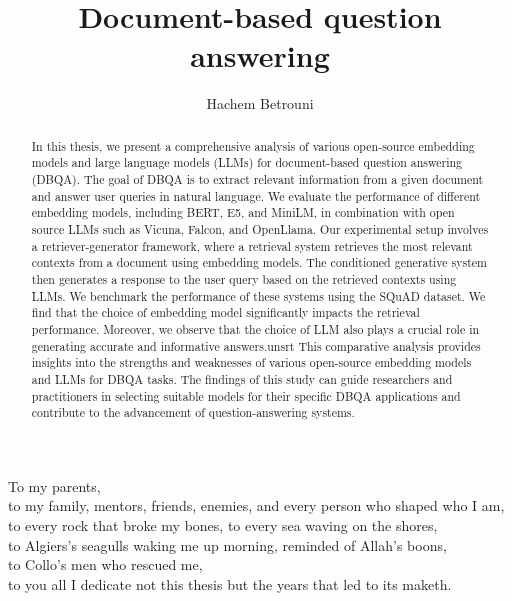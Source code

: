\documentclass[a4paper,12pt]{article}
\author[1,2]{Hachem Betrouni}
\affil[1]{National Polytechnic school of Algiers, Industrial Engineering Department, Data Science and AI, Algiers, hachem.betrouni@g.enp.edu.dz}
\affil[2]{BIGmama technology, France, hb@big-mama.io}
\title{Document-based question answering}
\begin{document}
\maketitle
\begin{abstract}
In this thesis, we present a comprehensive analysis of various open-source embedding models and large language models (LLMs) for document-based question answering (DBQA). The goal of DBQA is to extract relevant information from a given document and answer user queries in natural language. We evaluate the performance of different embedding models, including BERT, E5, and MiniLM, in combination with open source LLMs such as Vicuna, Falcon, and OpenLlama.
Our experimental setup involves a retriever-generator framework, where a retrieval system retrieves the most relevant contexts from a document using embedding models. The conditioned generative system then generates a response to the user query based on the retrieved contexts using LLMs. We benchmark the performance of these systems using the SQuAD dataset.
We find that the choice of embedding model significantly impacts the retrieval performance. Moreover, we observe that the choice of LLM also plays a crucial role in generating accurate and informative answers.unsrt
This comparative analysis provides insights into the strengths and weaknesses of various open-source embedding models and LLMs for DBQA tasks. The findings of this study can guide researchers and practitioners in selecting suitable models for their specific DBQA applications and contribute to the advancement of question-answering systems.
\end{abstract}
\clearpage
\begin{center}
    \thispagestyle{empty}
    \vspace*{\fill}
    To my parents,\\
    to my family, mentors, friends, enemies, and every person who shaped who I am, \\
    to every rock that broke my bones, to every sea waving on the shores, \\  
    to Algiers's seagulls waking me up morning, reminded of Allah's boons,\\
    to Collo's men who rescued me,\\
    to you all I dedicate not this thesis but the years that led to its maketh.\\
    \vspace*{\fill}
\end{center}
\clearpage


\onecolumn
\tableofcontents
\listoffigures
\listoftables
\end{document}
